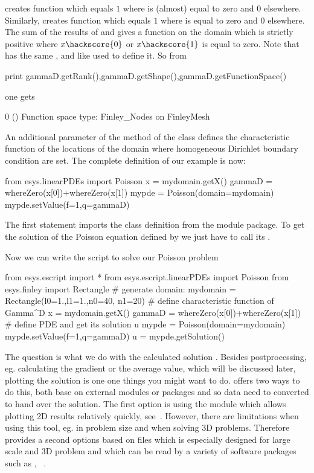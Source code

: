  creates function which equals $1$ where  is (almost) equal to zero 
and $0$ elsewhere. 
Similarly,  creates function which equals $1$ where  is 
equal to zero and $0$ elsewhere.
The sum of the results of  and  
gives a function on the domain  which is strictly positive where $x\hackscore{0}$ or $x\hackscore{1}$ is equal to zero.
Note that  has the same \Rank, \Shape and \FunctionSpace like  used to define it. So from 
\begin{python}
  print gammaD.getRank(),gammaD.getShape(),gammaD.getFunctionSpace()
\end{python}
one gets 
\begin{python}
  0 () Function space type: Finley_Nodes on FinleyMesh 
\end{python}
An additional parameter  of the  method of the \Poisson class defines the 
characteristic function  of the locations
of the domain where homogeneous Dirichlet boundary condition 
are set. The complete definition of our example is now: 
\begin{python}
  from esys.linearPDEs import Poisson
  x = mydomain.getX()
  gammaD = whereZero(x[0])+whereZero(x[1])
  mypde = Poisson(domain=mydomain)
  mypde.setValue(f=1,q=gammaD)
\end{python}
The first statement imports the \Poisson class definition from the \linearPDEs module \escript package.
To get the solution of the Poisson equation defined by  we just have to call its
. 

Now we can write the script to solve our Poisson problem
\begin{python}
  from esys.escript import *
  from esys.escript.linearPDEs import Poisson
  from esys.finley import Rectangle
  # generate domain:
  mydomain = Rectangle(l0=1.,l1=1.,n0=40, n1=20)
  # define characteristic function of Gamma^D
  x = mydomain.getX()
  gammaD = whereZero(x[0])+whereZero(x[1])
  # define PDE and get its solution u
  mypde = Poisson(domain=mydomain)
  mypde.setValue(f=1,q=gammaD)
  u = mypde.getSolution()
\end{python}
The question is what we do with the calculated solution . Besides postprocessing, eg. calculating the gradient or the average value, which will be discussed later, plotting the solution is one one things you might want to do. \escript offers two ways to do this, both base on external modules or packages and so data need to converted
to hand over the solution. The first option is using the \MATPLOTLIB module which allows plotting 2D results relatively quickly, see~\cite{matplotlib}. However, there are limitations when using this tool, eg. in problem size and when solving 3D problems. Therefore \escript provides a second options based on \VTK files which is especially
designed for large scale and 3D problem and which can be read by a variety of software packages such as \mayavi \cite{mayavi}, \VisIt~\cite{VisIt}. 

